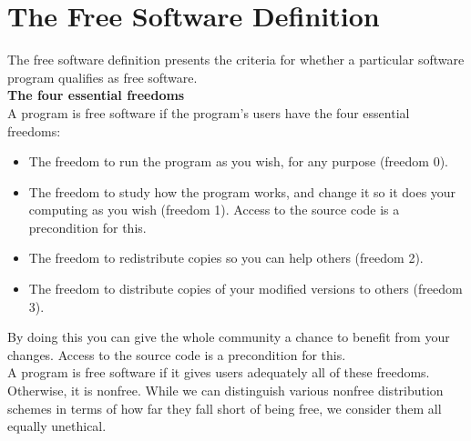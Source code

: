 \documentclass[6pt,a4paper]{report}
\begin{document}
\section*{The Free Software Definition}
The free software definition presents the criteria for whether a particular software program qualifies
as free software. \\
\textbf{The four essential freedoms} \\
A program is free software if the program's users have the four essential freedoms: \\
\begin{itemize}
\item The freedom to run the program as you wish, for any purpose (freedom 0).
\item The freedom to study how the program works, and change it so it does your computing as you
wish (freedom 1). Access to the source code is a precondition for this.
\item The freedom to redistribute copies so you can help others (freedom 2).
\item The freedom to distribute copies of your modified versions to others (freedom 3).
\end{itemize}
By doing this you can give the whole community a chance to benefit from your changes. Access to
the source code is a precondition for this. \\
A program is free software if it gives users adequately all of these freedoms. Otherwise, it is nonfree.
While we can distinguish various nonfree distribution schemes in terms of how far they fall short of
being free, we consider them all equally unethical.
\end{document}
